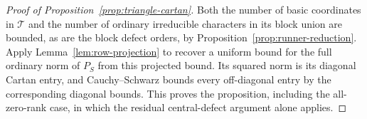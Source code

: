 \begin{proof}[Proof of Proposition~\ref{prop:triangle-cartan}]
Both the number of basic coordinates in $\mathcal T$
and the number of ordinary irreducible characters in
its block union are bounded, as are the block defect orders, by
Proposition~\ref{prop:runner-reduction}.  Apply
Lemma~\ref{lem:row-projection} to recover a uniform
bound for the full ordinary norm of $P_S$ from this
projected bound.  Its squared norm is its diagonal
Cartan entry, and Cauchy--Schwarz bounds every off-diagonal
entry by the corresponding diagonal bounds.  This
proves the proposition, including the all-zero-rank
case, in which the residual central-defect argument
alone applies.
\end{proof}

